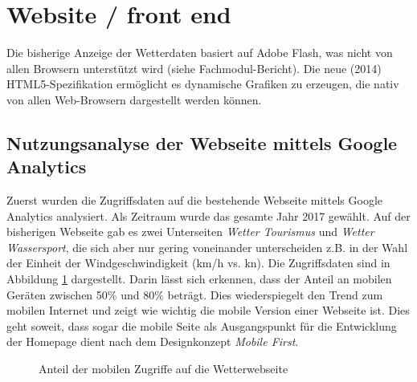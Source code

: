 \section{Website / front end}
Die bisherige Anzeige der Wetterdaten basiert auf Adobe Flash, was nicht von allen Browsern unterstützt wird (siehe Fachmodul-Bericht). Die neue (2014) HTML5-Spezifikation ermöglicht es dynamische Grafiken zu erzeugen, die nativ von allen Web-Browsern dargestellt werden können.



\subsection{Nutzungsanalyse der Webseite mittels Google Analytics}
\label{subsec:googleAnalytics}
Zuerst wurden die Zugriffsdaten auf die bestehende Webseite mittels Google Analytics analysiert. Als Zeitraum wurde das gesamte Jahr 2017 gewählt. Auf der bisherigen Webseite gab es zwei Unterseiten \textit{Wetter Tourismus} und \textit{Wetter Wassersport}, die sich aber nur gering voneinander unterscheiden z.B. in der Wahl der Einheit der Windgeschwindigkeit (km/h vs. kn). Die Zugriffsdaten sind in Abbildung \ref{img:google_mobile} dargestellt. Darin lässt sich erkennen, dass der Anteil an mobilen Geräten zwischen 50\% und 80\% beträgt. Dies wiederspiegelt den Trend zum mobilen Internet und zeigt wie wichtig die mobile Version einer Webseite ist. Dies geht soweit, dass sogar die mobile Seite als Ausgangspunkt für die Entwicklung der Homepage dient nach dem Designkonzept \textit{Mobile First}.

\begin{figure}[h!]
	\centering
	\caption{Anteil der mobilen Zugriffe auf die Wetterwebseite}
	\label{img:google_mobile}
\end{figure}

